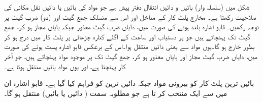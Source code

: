 شکل  میں (سلسلہ وار) بائیں و دائیں انتقال دفتر پیش ہے جو مواد کی بائیں یا دائیں نقل مکانی کی صلاحیت رکھتا ہے۔ مخارج  پلٹ کار کے مداخل  اور اس سے منسلک جمع گیٹ اور (دو) ضرب گیٹ پر توجہ رکھیں۔ قابو اشارہ  بلند ہونے کی صورت میں، دایاں ضرب گیٹ معذور جبکہ بایاں مجاز ہو کر، جمع گیٹ تک  پہنچاتے ہیں جو  پر دستیاب اور ساعت کے اگلے کنارہ چڑھائی پر پلٹ کار میں درج ہو کر بطور  خارج ہو گا۔یوں مواد  سے  یعنی دائیں منتقل ہوا۔اس کے برعکس قابو اشارہ پست ہونے کی صورت میں، دایاں ضرب گیٹ مجاز اور بایاں معذور ہو کر، جمع گیٹ تک  پر موجود مواد پہنچاتے ہیں، جو آخر کار  پہنچتا ہے، اور یوں مواد بائیں منتقل ہوتا ہے۔

 بائیں ترین پلٹ کار کو بیرونی مواد  جبکہ دائیں ترین کو  فراہم کیا گیا ہے۔ قابو اشارہ ان میں سے ایک منتخب کر تا ہے جو مطلوبہ سمت ( دائیں یا بائیں) منتقل ہو گا۔ 

